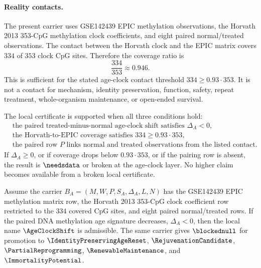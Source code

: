 \paragraph{Reality contacts.}
The present carrier uses GSE142439 EPIC methylation observations, the Horvath 2013 353-CpG methylation clock coefficients, and eight paired normal/treated observations. The contact between the Horvath clock and the EPIC matrix covers $334$ of $353$ clock CpG sites. Therefore the coverage ratio is
$$
\frac{334}{353}\approx 0.946 .
$$
This is sufficient for the stated age-clock contact threshold $334 \geq 0.93\cdot 353$. It is not a contact for mechanism, identity preservation, function, safety, repeat treatment, whole-organism maintenance, or open-ended survival.

\begin{definition}
\label{def:age-clock-support-break}
The local certificate is supported when all three conditions hold:
$$
\begin{aligned}
&\text{the paired treated-minus-normal age-clock shift satisfies }\Delta_A<0,\\
&\text{the Horvath-to-EPIC coverage satisfies }334\geq 0.93\cdot 353,\\
&\text{the paired row }P\text{ links normal and treated observations from the listed contact.}
\end{aligned}
$$
If $\Delta_A\geq 0$, or if coverage drops below $0.93\cdot 353$, or if the pairing row is absent, the result is $\needsdata$ or broken at the age-clock layer. No higher claim becomes available from a broken local certificate.
\end{definition}

\begin{theorem}
\label{thm:clock-only-no-promotion}
Assume the carrier $B_A=(M,W,P,S_A,\Delta_A,L,N)$ has the GSE142439 EPIC methylation matrix row, the Horvath 2013 353-CpG clock coefficient row restricted to the $334$ covered CpG sites, and eight paired normal/treated rows. If the paired DNA methylation age signature decreases, $\Delta_A<0$, then the local name $\AgeClockShift$ is admissible. The same carrier gives $\blockednull$ for promotion to $\IdentityPreservingAgeReset$, $\RejuvenationCandidate$, $\PartialReprogramming$, $\RenewableMaintenance$, and $\ImmortalityPotential$.
\end{theorem}

